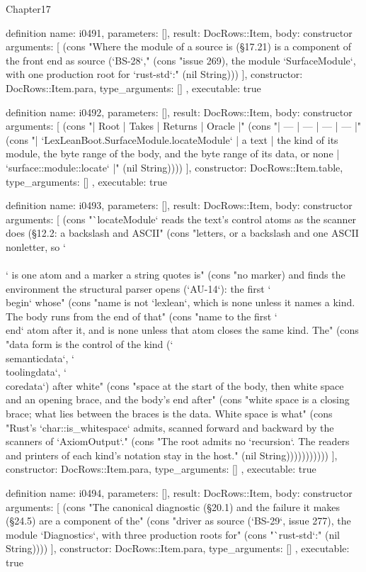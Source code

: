 \begin{lexlean}{Chapter17}
\begin{semanticmodule}
definition{
  name: i0491,
  parameters: [],
  result: DocRows::Item,
  body: constructor{
    arguments: [
      (cons "Where the module of a source is (§17.21) is a component of the front end as source (`BS-28`," (cons "issue 269), the module `SurfaceModule`, with one production root for `rust-std`:" (nil String)))
    ],
    constructor: DocRows::Item.para,
    type_arguments: []
  },
  executable: true
}

definition{
  name: i0492,
  parameters: [],
  result: DocRows::Item,
  body: constructor{
    arguments: [
      (cons "| Root | Takes | Returns | Oracle |" (cons "| --- | --- | --- | --- |" (cons "| `LexLeanBoot.SurfaceModule.locateModule` | a text | the kind of its module, the byte range of the body, and the byte range of its data, or none | `surface::module::locate` |" (nil String))))
    ],
    constructor: DocRows::Item.table,
    type_arguments: []
  },
  executable: true
}

definition{
  name: i0493,
  parameters: [],
  result: DocRows::Item,
  body: constructor{
    arguments: [
      (cons "`locateModule` reads the text's control atoms as the scanner does (§12.2: a backslash and ASCII" (cons "letters, or a backslash and one ASCII nonletter, so `\\\\` is one atom and a marker a string quotes is" (cons "no marker) and finds the environment the structural parser opens (`AU-14`): the first `\\begin` whose" (cons "name is not `lexlean`, which is none unless it names a kind. The body runs from the end of that" (cons "name to the first `\\end` atom after it, and is none unless that atom closes the same kind. The" (cons "data form is the control of the kind (`\\semanticdata`, `\\toolingdata`, `\\coredata`) after white" (cons "space at the start of the body, then white space and an opening brace, and the body's end after" (cons "white space is a closing brace; what lies between the braces is the data. White space is what" (cons "Rust's `char::is_whitespace` admits, scanned forward and backward by the scanners of `AxiomOutput`." (cons "The root admits no `recursion`. The readers and printers of each kind's notation stay in the host." (nil String)))))))))))
    ],
    constructor: DocRows::Item.para,
    type_arguments: []
  },
  executable: true
}

definition{
  name: i0494,
  parameters: [],
  result: DocRows::Item,
  body: constructor{
    arguments: [
      (cons "The canonical diagnostic (§20.1) and the failure it makes (§24.5) are a component of the" (cons "driver as source (`BS-29`, issue 277), the module `Diagnostics`, with three production roots for" (cons "`rust-std`:" (nil String))))
    ],
    constructor: DocRows::Item.para,
    type_arguments: []
  },
  executable: true
}


\end{semanticmodule}
\end{lexlean}
